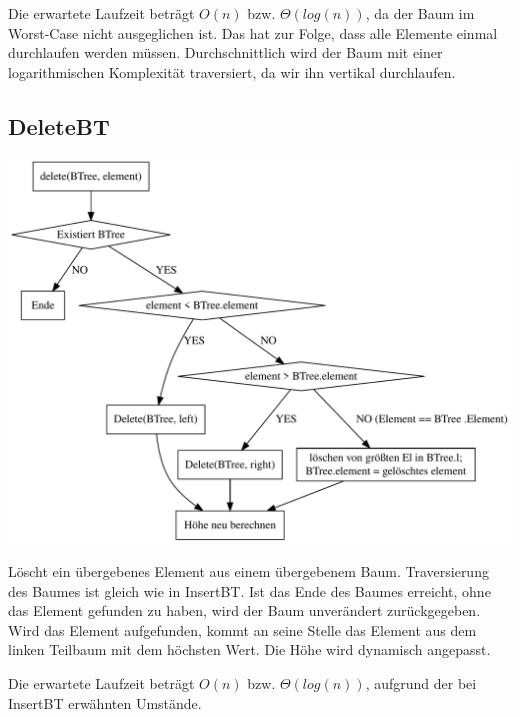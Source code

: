 \documentclass[11pt]{article}
\begin{document}
    Die erwartete Laufzeit beträgt
    \begin{math}
        O(n)
    \end {math}
    bzw.
    \begin{math}
        \Theta (log (n))
    \end{math},
    da der Baum im Worst-Case nicht ausgeglichen ist.
    Das hat zur Folge, dass alle Elemente einmal durchlaufen werden müssen.
    Durchschnittlich wird der Baum mit einer logarithmischen Komplexität
    traversiert, da wir ihn vertikal durchlaufen.

    \subsection{DeleteBT}

    \begin{center}
        \includegraphics[width=0.8\columnwidth] {delete}
    \end{center}

    Löscht ein übergebenes Element aus einem übergebenem Baum.
    Traversierung des Baumes ist gleich wie in InsertBT.
    Ist das Ende des Baumes erreicht, ohne das Element gefunden zu haben,
    wird der Baum unverändert zurückgegeben.
    Wird das Element aufgefunden,
    kommt an seine Stelle das Element aus dem linken Teilbaum mit dem höchsten Wert.
    Die Höhe wird dynamisch angepasst.

    Die erwartete Laufzeit beträgt
    \begin{math}
        O(n)
    \end {math}
    bzw.
    \begin{math}
        \Theta (log (n))
    \end{math},
    aufgrund der bei InsertBT erwähnten Umstände.
\end{document}
